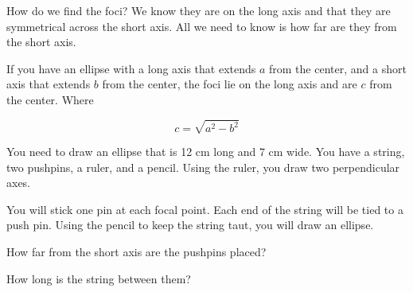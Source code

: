 How do we find the foci? We know they are on the long axis and that
they are symmetrical across the short axis. All we need to know is how
far are they from the short axis.

\begin{mdframed}[style=important, frametitle={Distance from Center to the Foci}]

If you have an ellipse with a long axis that extends $a$ from the center,
and a short axis that extends $b$ from the center, the foci
lie on the long axis and are $c$ from the center. Where

$$c = \sqrt{a^2 - b^2}$$

\end{mdframed}

\begin{Exercise}[title={Foci of an ellipse}, label=ellipse_foci]
  
You need to draw an ellipse that is 12 cm long and 7 cm wide. You
have a string, two pushpins, a ruler, and a pencil. Using the ruler,
you draw two perpendicular axes.

You will stick one pin at each focal point. Each end of the string
will be tied to a push pin. Using the pencil to keep the string taut, you will draw
an ellipse.


How far from the short axis are the pushpins placed?

How long is the string between them?

\end{Exercise}
